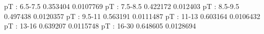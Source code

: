 pT : 6.5-7.5
0.353404 0.0107769
pT : 7.5-8.5
0.422172 0.012403
pT : 8.5-9.5
0.497438 0.0120357
pT : 9.5-11
0.563191 0.0111487
pT : 11-13
0.603164 0.0106432
pT : 13-16
0.639207 0.0115748
pT : 16-30
0.648605 0.0128694

